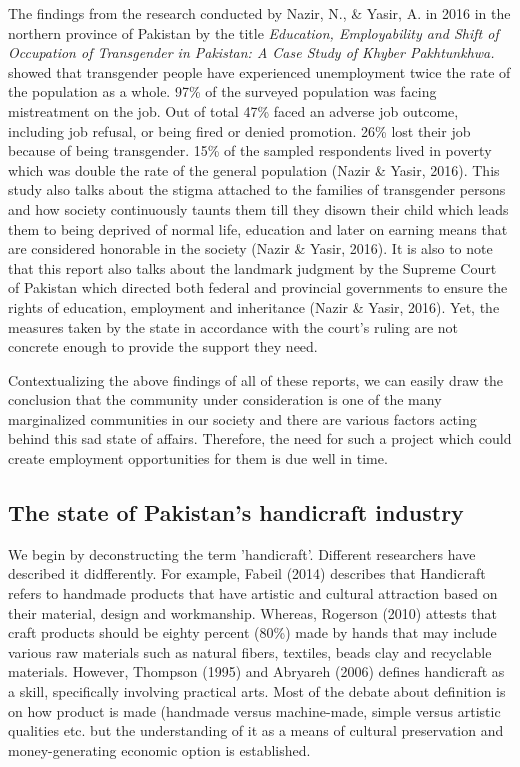 The findings from the research conducted by Nazir, N., \& Yasir, A. in 2016 in the northern province of Pakistan by the title \textit {Education, Employability and Shift of Occupation of Transgender in Pakistan: A Case Study of Khyber Pakhtunkhwa.} showed that transgender people have experienced unemployment twice the rate of the population as a whole. 97\% of the surveyed population was facing mistreatment on the job. Out of total 47\% faced an adverse job outcome, including job refusal, or being fired or denied promotion. 26\% lost their job because of being transgender. 15\% of the sampled respondents lived in poverty which was double the rate of the general population (Nazir \& Yasir, 2016). This study also talks about the stigma attached to the families of transgender persons and how society continuously taunts them till they disown their child which leads them to being deprived of normal life, education and later on earning means that are considered honorable in the society (Nazir \& Yasir, 2016). It is also to note that this report also talks about the landmark judgment by the Supreme Court of Pakistan which directed both federal and provincial governments to ensure the rights of education, employment and inheritance (Nazir \& Yasir, 2016). Yet, the measures taken by the state in accordance with the court's ruling are not concrete enough to provide the support they need.

Contextualizing the above findings of all of these reports, we can easily draw the conclusion that the community under consideration is one of the many marginalized communities in our society and there are various factors acting behind this sad state of affairs. Therefore, the need for such a project which could create employment opportunities for them is due well in time.

\subsection{The state of Pakistan's handicraft industry}

We begin by deconstructing the term 'handicraft'. Different researchers have described it didfferently. For example, Fabeil (2014) describes that Handicraft refers to handmade products that have artistic and cultural attraction based on their material, design and workmanship. Whereas, Rogerson (2010) attests that craft products should be eighty percent (80\%) made by hands that may include various raw materials such as natural fibers, textiles, beads clay and recyclable materials. However, Thompson (1995) and Abryareh (2006) defines handicraft as a skill, specifically involving practical arts. Most of the debate about definition is on how product is made (handmade versus machine-made, simple versus artistic qualities etc. but the understanding of it as a means of cultural preservation and money-generating economic option is established.

